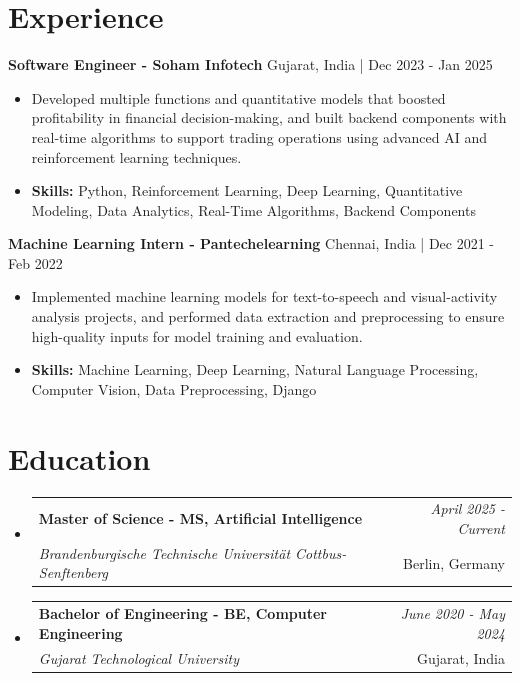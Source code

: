 \documentclass[a4paper,11pt]{article}
\makeatletter
\newcommand{\resumeSubheading}[4]{
\vspace{0.5mm}\item
    \begin{tabular*}{\linewidth}[t]{l@{\extracolsep{\fill}}r}
        \textbf{#1} & \textit{\footnotesize{#4}} \\
        \textit{\footnotesize{#3}} &  \footnotesize{#2}\\
    \end{tabular*}
    \vspace{-2.4mm}
}
\makeatother
\begin{document}
\section{\textbf{Experience}}


\vspace{1mm}
  \textbf{Software Engineer - Soham Infotech} \hfill Gujarat, India | Dec 2023 - Jan 2025
\vspace{-1.5mm} %
\begin{itemize}
  \item Developed multiple functions and quantitative models that boosted profitability in financial decision-making, and built backend components with real-time algorithms to support trading operations using advanced AI and reinforcement learning techniques.

\vspace{-2mm}
  \item \textbf{Skills:} Python, Reinforcement Learning, Deep Learning, Quantitative Modeling, Data Analytics, Real-Time Algorithms, Backend Components
\end{itemize}

\vspace{1mm}
  \textbf{Machine Learning Intern - Pantechelearning} \hfill Chennai, India | Dec 2021 - Feb 2022
\vspace{-1.5mm} %
\begin{itemize}
  \item Implemented machine learning models for text-to-speech and visual-activity analysis projects, and performed data extraction and preprocessing to ensure high-quality inputs for model training and evaluation.
\vspace{-2mm}
  \item \textbf{Skills:} Machine Learning, Deep Learning, Natural Language Processing, Computer Vision, Data Preprocessing, Django
\end{itemize}\section{\textbf{Education}}
\vspace{-0.4mm}

\begin{itemize}[leftmargin=0.15in, label={}]
\resumeSubheading
{Master of Science - MS, Artificial Intelligence }{Berlin, Germany}
{Brandenburgische Technische Universität Cottbus-Senftenberg  }{April 2025 - Current}

\vspace{1.0mm} %
\resumeSubheading
{Bachelor of Engineering - BE, Computer Engineering  }{Gujarat, India}
{Gujarat Technological University }{June 2020 - May 2024}

\end{itemize}
\end{document}
